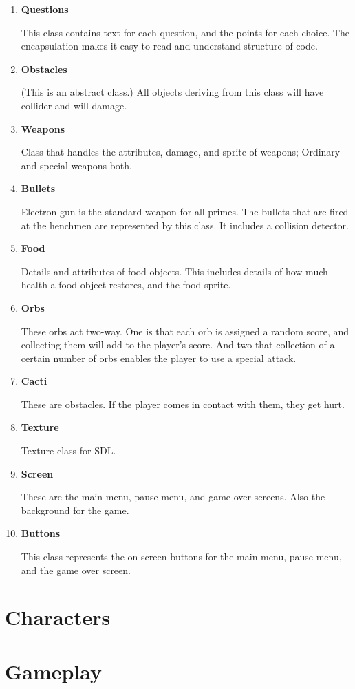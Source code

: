 \documentclass[a4paper, 11pt]{report}
\begin{document}
\begin{enumerate}
			\item \textbf{Questions}
				
				This class contains text for each question, and the points for each choice. The encapsulation makes it easy to read and understand structure of code. 

			\item \textbf{Obstacles}
				
				(This is an abstract class.) All objects deriving from this class will have collider and will damage. 

			\item \textbf{Weapons} 
				
				Class that handles the attributes, damage, and sprite of weapons; Ordinary and special weapons both.

			\item \textbf{Bullets}
				
				Electron gun is the standard weapon for all primes. The bullets that are fired at the henchmen are represented by this class. 
				It includes a collision detector. 

			\item \textbf{Food} 
				
				Details and attributes of food objects. This includes details of how much health a food object restores, and the food sprite.

			\item \textbf{Orbs}
				
				These orbs act two-way. One is that each orb is assigned a random score, and collecting them will add to the player’s score. 
				And two that collection of a certain number of orbs enables the player to use a special attack. 

			\item \textbf{Cacti}
				
				These are obstacles. If the player comes in contact with them, they get hurt. 

			\item \textbf{Texture}
				
				Texture class for SDL.

			\item \textbf{Screen}
				
				These are the main-menu, pause menu, and game over screens. Also the background for the game. 

			\item \textbf{Buttons}
				
				This class represents the on-screen buttons for the main-menu, pause menu, and the game over screen. 

		\end{enumerate}
	\section{Characters}
	\section{Gameplay}
\end{document}
